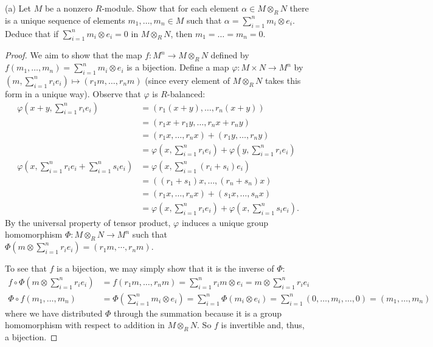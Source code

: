 \documentclass[10pt]{article}
\begin{document}
\begin{enumerate}
(a) Let $M$ be a nonzero $R$-module.  Show that for each element $\alpha \in M \otimes_R N$ there is a unique sequence of elements $m_1,\ldots,m_n \in M$ such that $\alpha = \sum_{i=1}^n m_i \otimes e_i$.  Deduce that if $\sum_{i=1}^n m_i \otimes e_i = 0$ in $M \otimes_R N$, then $m_1=\ldots=m_n=0$.

\begin{proof}
We aim to show that the map $f: M^n \rightarrow M \otimes_R N$ defined by $f(m_1, \dots , m_n) = \sum_{i=1}^n m_i \otimes e_i$ is a bijection.  Define a map $\varphi: M \times N \rightarrow M^n$ by $(m, \sum_{i=1}^n r_i e_i) \mapsto (r_1 m, \dots , r_n m)$ (since every element of $M \otimes_R N$ takes this form in a unique way).  Observe that $\varphi$ is $R$-balanced:
\begin{align*}
\varphi(x + y, \sum_{i=1}^n r_i e_i)
&= (r_1(x+y), \dots , r_n(x+y))
\\
&= (r_1x+ r_1y, \dots , r_nx+ r_ny)
\\
&= (r_1x, \dots , r_n x) + (r_1y, \dots , r_ny)
\\
&= \varphi(x, \sum_{i=1}^n r_i e_i) + \varphi(y, \sum_{i=1}^n r_i e_i)
\\
\varphi(x, \sum_{i=1}^n r_i e_i + \sum_{i=1}^n s_i e_i)
&= \varphi(x, \sum_{i=1}^n (r_i + s_i) e_i)
\\
&= ((r_1 + s_1)x, \dots , (r_n + s_n)x)
\\
&= (r_1x, \dots , r_nx) + (s_1x, \dots  , s_nx)
\\
&= \varphi(x, \sum_{i=1}^n r_i e_i) + \varphi(x, \sum_{i=1}^n s_i e_i).
\end{align*}
By the universal property of tensor product, $\varphi$ induces a unique group homomorphism $\Phi: M \otimes_R N \rightarrow M^n$ such that $\Phi(m \otimes \sum_{i=1}^n r_i e_i) = (r_1m, \cdots , r_nm)$.

To see that $f$ is a bijection, we may simply show that it is the inverse of $\Phi$:
\begin{align*}
f \circ \Phi(m \otimes \sum_{i=1}^n r_i e_i)
&= f(r_1m, \dots , r_nm) = \sum_{i=1}^n r_im \otimes e_i = m \otimes \sum_{i=1}^n r_i e_i
\\
\Phi \circ f(m_1, \dots , m_n)
&= \Phi(\sum_{i=1}^n m_i \otimes e_i)
= \sum_{i=1}^n \Phi(m_i \otimes e_i)
= \sum_{i=1}^n (0,\dots,m_i,\dots,0)
= (m_1, \dots , m_n)
\end{align*}
where we have distributed $\Phi$ through the summation because it is a group homomorphism with respect to addition in $M \otimes_R N$.  So $f$ is invertible and, thus, a bijection.


\end{proof}
\end{enumerate}
\end{document}
